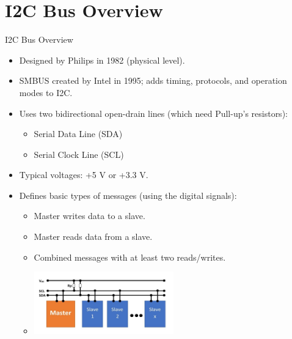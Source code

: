 
\section{I2C Bus Overview}
\begin{frame}{I2C Bus Overview}
    \begin{itemize}
        \item Designed by Philips in 1982 (physical level).
        \item SMBUS created by Intel in 1995; adds timing, protocols, and operation modes to I2C.
        \item Uses two bidirectional open-drain lines (which need Pull-up's resistors):
        \begin{itemize}
            \item Serial Data Line (SDA)
            \item Serial Clock Line (SCL)
        \end{itemize}
        \item Typical voltages: +5 V or +3.3 V.
        \item Defines basic types of messages (using the digital signals):
        \begin{itemize}
            \item Master writes data to a slave.
            \item Master reads data from a slave.
            \item Combined messages with at least two reads/writes.
            \item[\hspace{1em}] \includegraphics[width=0.5\textwidth]{trainingmaterials/i2c/i2cbasic.jpg}
        \end{itemize}
    \end{itemize}
\end{frame}

